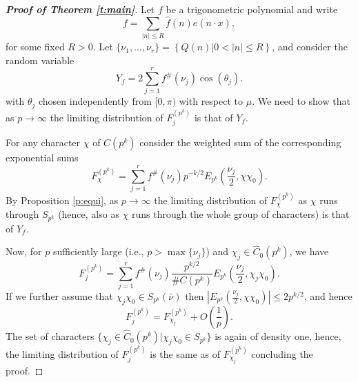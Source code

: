 \documentclass[12pt]{amsart}
\theoremstyle{definition}
\theoremstyle{remark}
\numberwithin{equation}{section}
\newcommand{\set}[1]{\left\{#1\right\}}
\begin{document}
\begin{proof}[\bf{Proof of Theorem \ref{t:main}}]
Let $f$ be a trigonometric polynomial and write
\[f=\sum_{|n|\leq R}\hat{f}(n)e(n\cdot x),\]
for some fixed $R>0$. Let
$\{\nu_1,\ldots,\nu_r\}=\set{Q(n)|0<|n|\leq R}$, and consider the
random variable
\[Y_f=2\sum_{j=1}^r f^\#(\nu_j)\cos(\theta_j).\]
with $\theta_j$ chosen independently from $[0,\pi)$ with respect to
$\mu$. We need to show that as $p\to\infty$ the limiting
distribution of $F_j^{(p^k)}$ is that of $Y_f$.

For any character $\chi$ of $C(p^k)$ consider the weighted sum of
the corresponding exponential sums
\[F^{(p^k)}_\chi=\sum_{j=1}^r  f^\#(\nu_j)p^{-k/2}E_{p^k}(\frac{\nu_j}{2},\chi\chi_0).\]
By Proposition \ref{p:equi}, as $p\to\infty$ the limiting
distribution of $F^{(p^k)}_\chi$ as $\chi$ runs through $S_{p^k}$
(hence, also as $\chi$ runs through the whole group of characters)
is that of $Y_f$.

Now, for $p$ sufficiently large (i.e., $p>\max\{\nu_j\}$) and
$\chi_j\in \hat{C}_0(p^k)$, we have
\[F_j^{(p^k)}=\sum_{j=1}^r  f^\#(\nu_j)\frac{p^{k/2}}{\# C(p^k)}E_{p^k}(\frac{\nu_j}{2},\chi_j\chi_0).\]
If we further assume that $\chi_j\chi_0\in S_{p^k}(\bar\nu)$ then
$|E_{p^k}(\frac{\nu_j}{2},\chi\chi_0)|\leq2p^{k/2}$, and hence
\[F_j^{(p^k)}=F^{(p^k)}_{\chi_j}+O(\frac{1}{p}).\]
The set of characters $\{\chi_j\in \hat{C}_0(p^k)|\chi_j\chi_0\in
S_{p^k}\}$ is again of density one, hence, the limiting distribution
of $F_j^{(p^k)}$ is the same as of $F^{(p^k)}_{\chi_j}$ concluding
the proof.
\end{proof}
\end{document}
